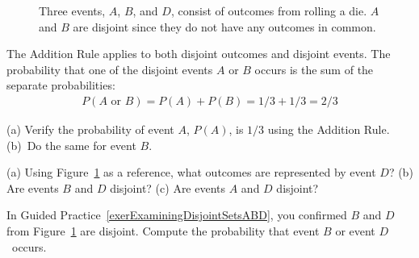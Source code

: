 \begin{figure}[hhh]
  \centering
  \caption{Three events, $A$, $B$, and $D$, consist of
      outcomes from rolling a die.
      $A$ and $B$ are disjoint since they do not have
      any outcomes in common.}
  \label{disjointSets}
\end{figure}

The Addition Rule applies to both disjoint outcomes and disjoint events. The probability that one of the disjoint events $A$ or $B$ occurs is the sum of the separate probabilities:
\begin{align*}
P(A\text{ or }B) = P(A) + P(B) = 1/3 + 1/3 = 2/3
\end{align*}

\begin{exercisewrap}
\begin{nexercise}
(a) Verify the probability of event $A$, $P(A)$,
is $1/3$ using the Addition Rule.
(b)~Do the same for event $B$.\footnotemark
\end{nexercise}
\end{exercisewrap}

\begin{exercisewrap}
\begin{nexercise} \label{exerExaminingDisjointSetsABD}
(a) Using Figure~\ref{disjointSets} as a reference, what outcomes are represented by event $D$? (b) Are events $B$ and $D$ disjoint? (c) Are events $A$ and $D$ disjoint?\footnotemark
\end{nexercise}
\end{exercisewrap}

\begin{exercisewrap}
\begin{nexercise}
In Guided Practice~\ref{exerExaminingDisjointSetsABD}, you confirmed $B$ and $D$ from Figure~\ref{disjointSets} are disjoint. Compute the probability that event $B$ or event $D$~occurs.\footnotemark
\end{nexercise}
\end{exercisewrap}


